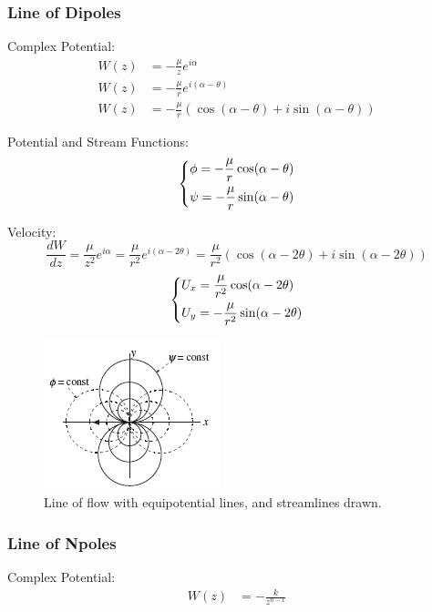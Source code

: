 \subsubsection{Line of Dipoles}
Complex Potential:
\begin{align}
    W(z) &= -\frac{\mu}{z} e^{i\alpha} \\
    W(z) &= -\frac{\mu}{r} e^{i(\alpha-\theta)} \\
    W(z) &= -\frac{\mu}{r} \left(\cos(\alpha-\theta) +i \sin(\alpha-\theta)  \right)
\end{align}

Potential and Stream Functions:
\begin{equation}
    \begin{dcases}
        \phi = -\frac{\mu}{r} \cos(\alpha-\theta) \\
        \psi = -\frac{\mu}{r} \sin(\alpha-\theta)
    \end{dcases}
\end{equation}

Velocity:
\begin{equation}
    \frac{dW}{dz} = \frac{\mu}{z^2} e^{i\alpha}  =  \frac{\mu}{r^2} e^{i(\alpha-2\theta)} = \frac{\mu}{r^2}\left( \cos(\alpha -2\theta) + i \sin(\alpha-2\theta) \right) 
\end{equation}
\begin{equation}
    \begin{dcases}
        U_x = \frac{\mu}{r^2}\cos(\alpha -2\theta) \\
        U_y = - \frac{\mu}{r^2}\sin(\alpha -2\theta)
    \end{dcases}
\end{equation}

\begin{figure}[!h]
    \centering
    \includegraphics[scale=1.0]{./img/dipole_flow.png}
    \caption{Line of flow with equipotential lines, and streamlines drawn.}
    \label{joukowski_cylinder}
\end{figure}

\subsubsection{Line of Npoles}
Complex Potential:
\begin{align}
    W(z) &= -\frac{k}{z^{n-1}} 
\end{align}

